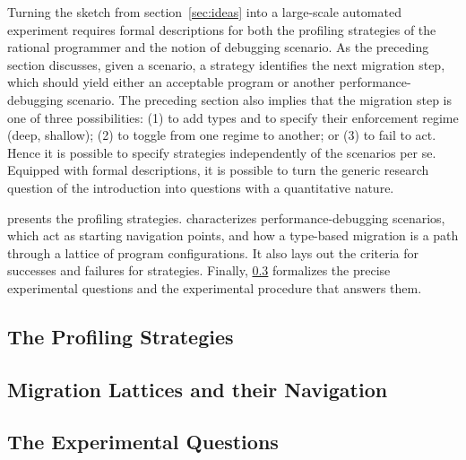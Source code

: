 
Turning the sketch from section~\ref{sec:ideas} into a large-scale
automated experiment requires formal descriptions for both the profiling
strategies of the rational programmer and the notion of debugging
scenario. As the preceding section discusses, given a scenario, a strategy
identifies the next migration step, which should yield either an acceptable
program or another performance-debugging scenario.  The preceding section
also implies that the migration step is one of three possibilities: (1)
to add types and to specify their enforcement regime (deep, shallow); (2)
to toggle from one regime to another; or (3) to fail to act. Hence it is
possible to specify strategies independently of the scenarios per se.
Equipped with formal descriptions, it is possible to turn the generic
research question of the introduction into questions with a quantitative
nature.

 presents the profiling strategies.
 characterizes performance-debugging
scenarios, which act as starting navigation points,
and how a type-based migration is a path
through a lattice of program configurations.
It also lays out the criteria for successes and failures for strategies.
Finally, \cref{subsec:questions} formalizes the precise experimental
questions and the experimental procedure that answers them.


\def\exp#1#2{\subsection{#2} \label{subsec:#1} }

\exp{strategies}{The Profiling Strategies}
\exp{lattice}{Migration Lattices and their Navigation}
\exp{questions}{The Experimental Questions}
